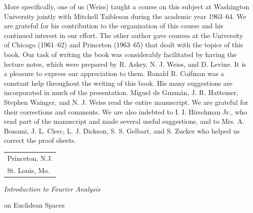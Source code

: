 More specifically, one of us (Weiss) taught a course on this subject at
Washington University jointly with Mitchell Taibleson during the academic year
1963--64. We are grateful for his contribution to the organization of this course
and his continued interest in our effort. The other author gave courses at the
University of Chicago (1961--62) and Princeton (1963--65) that dealt with the
topics of this book. Our task of writing the book was considerably facilitated
by having the lecture notes, which were prepared by R. Askey, N. J. Weiss, and
D. Levine. It is a pleasure to express our appreciation to them. Ronald R.
Coifman was a constant help throughout the writing of this book. His many
suggestions are incorporated in much of the presentation. Miguel de Guzm\'an,
J. R. Hattemer, Stephen Wainger, and N. J. Weiss read the entire manuscript. We
are grateful for their corrections and comments. We are also indebted to
I. I. Hirschman Jr., who read part of the manuscript and made several useful
suggestions, and to Mrs. A. Bonami, J. L. Clerc, L. J. Dickson, S. S. Gelbart,
and S. Zucker who helped us correct the proof sheets.

\vspace{2ex}
\noindent
\hangindent=0pt
\begin{tabular}{@{}l}
Princeton, N.J.\\
St. Louis, Mo.
\end{tabular}

\cleardoublepage

\thispagestyle{empty}
\vspace*{\fill}
\begin{center}
\large\itshape Introduction to Fourier Analysis

on Euclidean Spaces
\end{center}
\vfill
\cleardoublepage
